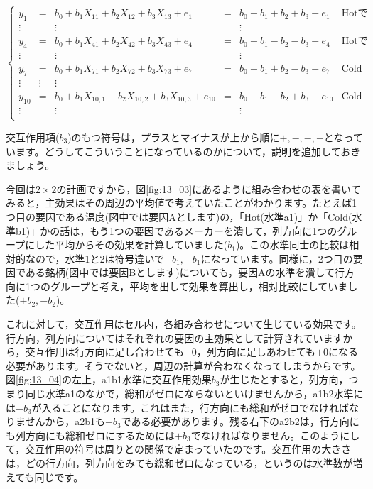 \documentclass{ltjbook}
\begin{document}
\[
	\label{eq13_06}
	\left\{
	\begin{array}{cccccc}
		y_1    & =      & b_0 + b_1 X_{11} + b_2 X_{12} + b_3 X_{13}+ e_1          & = & b_0 + b_1 + b_2  + b_3 + e_1   & \mbox{Hotで銘柄A}  \\
		\vdots &        & \vdots                                                   &   & \vdots                                           \\
		y_4    & =      & b_0 + b_1 X_{41} + b_2 X_{42} + b_3 X_{43}+ e_4          & = & b_0 + b_1 - b_2 - b_3 + e_4    & \mbox{Hotで銘柄B}  \\
		\vdots &        & \vdots                                                   &   & \vdots                                           \\
		y_7    & =      & b_0 + b_1 X_{71} + b_2 X_{72} + b_3 X_{73}+ e_7          & = & b_0 - b_1 + b_2 - b_3 + e_7    & \mbox{Coldで銘柄A} \\
		\vdots & \vdots & \vdots                                                                                                          \\
		y_{10} & =      & b_0 + b_1 X_{10,1} + b_2 X_{10,2} + b_3 X_{10,3}+ e_{10} & = & b_0 - b_1 - b_2+ b_3  + e_{10} & \mbox{Coldで銘柄B} \\
		\vdots &        & \vdots                                                   &   & \vdots                         &                 \\
	\end{array}
	\right .
\]

交互作用項($b_3$)のもつ符号は，プラスとマイナスが上から順に$+,-,-,+$となっています。どうしてこういうことになっているのかについて，説明を追加しておきましょう。

今回は$2\times2$の計画ですから，図\ref{fig:13_03}にあるように組み合わせの表を書いてみると，主効果はその周辺の平均値で考えていたことがわかります。たとえば1つ目の要因である温度(図中では要因Aとします)の，「Hot(水準a1)」か「Cold(水準b1)」かの話は，もう1つの要因であるメーカーを潰して，列方向に1つのグループにした平均からその効果を計算していました($b_1$)。この水準同士の比較は相対的なので，水準1と2は符号違いで$+b_1,-b_1$になっています。同様に，2つ目の要因である銘柄(図中では要因Bとします)についても，要因Aの水準を潰して行方向に1つのグループと考え，平均を出して効果を算出し，相対比較にしていました($+b_2,-b_2$)。

これに対して，交互作用はセル内，各組み合わせについて生じている効果です。行方向，列方向についてはそれぞれの要因の主効果として計算されていますから，交互作用は行方向に足し合わせても$\pm 0$，列方向に足しあわせても$\pm 0$になる必要があります。そうでないと，周辺の計算が合わなくなってしまうからです。図\ref{fig:13_04}の左上，a1b1水準に交互作用効果$b_3$が生じたとすると，列方向，つまり同じ水準a1のなかで，総和がゼロにならないといけませんから，a1b2水準には$-b_3$が入ることになります。これはまた，行方向にも総和がゼロでなければなりませんから，a2b1も$-b_3$である必要があります。残る右下のa2b2は，行方向にも列方向にも総和ゼロにするためには$+b_3$でなければなりません。このようにして，交互作用の符号は周りとの関係で定まっていたのです。交互作用の大きさは，どの行方向，列方向をみても総和ゼロになっている，というのは水準数が増えても同じです。
\end{document}
